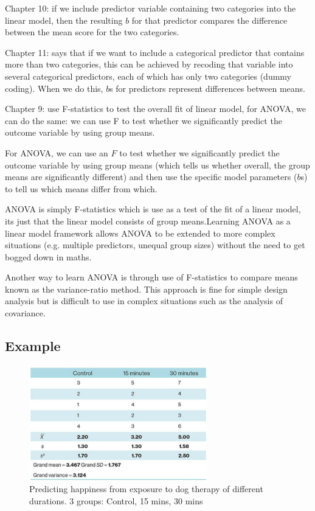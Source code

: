 Chapter 10: if we include predictor variable containing two categories into the linear model, then the resulting $b$ for that predictor compares the difference between the mean score for the two categories. 

Chapter 11: says that if we want to include a categorical predictor that contains more than two categories, this can be achieved by recoding that variable into several categorical predictors, each of which has only two categories (dummy coding). When we do this, $b$s for predictors represent differences between means.

Chapter 9: use F-statistics to test the overall fit of linear model, for ANOVA, we can do the same: we can use F to test  whether we significantly predict the outcome variable by using group means. 

For ANOVA, we can use an $F$ to test whether we significantly predict the outcome variable by using group means (which tells us whether overall, the group means are significantly different) and then use the specific model parameters ($b$s) to tell us which means differ from which. 

ANOVA is simply F-statistics which is use as a test of the fit of a linear model, its just that the linear model consists of group means.Learning ANOVA as a linear model framework allows ANOVA to be extended to more complex situations (e.g. multiple predictors, unequal group sizes) without the need to get bogged down in maths.

Another way to learn ANOVA is through use of F-statistics to compare means known as the variance-ratio method. This approach is fine for simple design analysis but is difficult to use in complex situations such as the analysis of covariance.
\clearpage

\subsection{Example}
\begin{figure}[h]
	\includegraphics[width=.6\textwidth,height=50mm]{Chapter 12 GLM 1 Comparing Several Independent Means ANOVA/dataexample.PNG}
	\caption{Predicting happiness from exposure to dog therapy of different durations. 3 groups: Control, 15 mins, 30 mins}
\end{figure}

